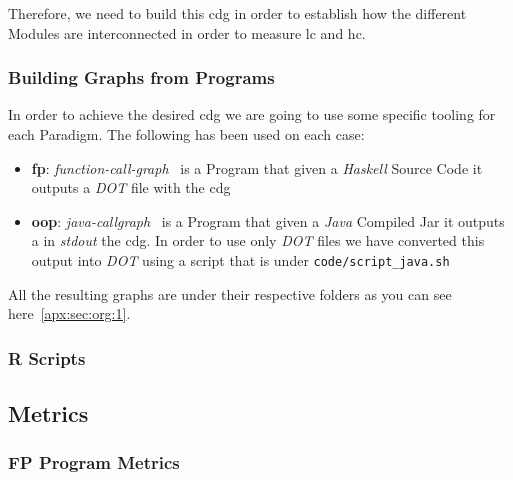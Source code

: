 \documentclass[12pt, a4paper]{article}
\begin{document}
Therefore, we need to build this \acrlong{cdg} in order to establish how the different Modules are interconnected in order to measure \acrshort{lc} and \acrshort{hc}.

\subsubsection{Building Graphs from Programs}
In order to achieve the desired \acrlong{cdg} we are going to use some specific tooling for each Paradigm.
The following has been used on each case:

\begin{itemize}
    \item \textbf{\acrlong{fp}}: \textit{function-call-graph}~\cite{fp_callgraph} is a Program that given a \textit{Haskell} Source Code it outputs a \textit{DOT} file with the \acrlong{cdg}
    \item \textbf{\acrlong{oop}}: \textit{java-callgraph}~\cite{java_callgraph} is a Program that given a \textit{Java} Compiled Jar it outputs a in \textit{stdout} the \acrlong{cdg}. In order to use only \textit{DOT} files we have converted this output into \textit{DOT} using a script that is under \texttt{code/script_java.sh}
\end{itemize}

All the resulting graphs are under their respective folders as you can see here~\ref{apx:sec:org:1}.

\subsubsection{R Scripts}

\subsection{Metrics}
\subsubsection{FP Program Metrics}
\end{document}
